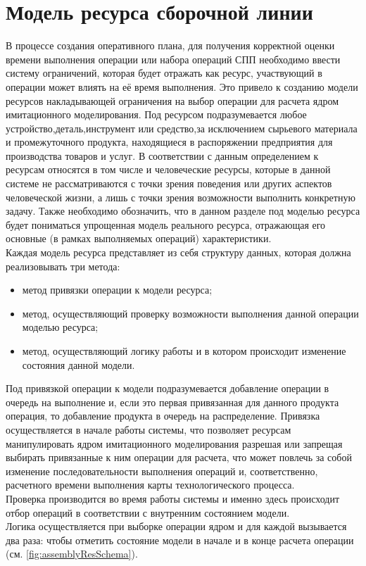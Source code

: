\section{Модель ресурса сборочной линии}
\indent В процессе создания оперативного плана, для получения корректной оценки времени выполнения операции или набора операций СПП необходимо ввести систему ограничений, которая будет отражать как ресурс, участвующий в операции может влиять на её время выполнения.
Это привело к созданию модели ресурсов накладывающей ограничения на выбор операции для расчета ядром имитационного моделирования.
Под ресурсом подразумевается любое устройство,деталь,инструмент или средство,за исключением сырьевого материала и промежуточного продукта, находящиеся в распоряжении предприятия для производства товаров и услуг.
В соответствии с данным определением к ресурсам относятся в том числе и человеческие ресурсы, которые в данной системе не рассматриваются с точки зрения поведения или других аспектов человеческой жизни, а лишь с точки зрения возможности выполнить конкретную задачу.
Также необходимо обозначить, что в данном разделе под моделью ресурса будет пониматься упрощенная модель реального ресурса, отражающая его основные (в рамках выполняемых операций) характеристики.\\
\indent Каждая модель ресурса представляет из себя структуру данных, которая должна реализовывать три метода:
\begin{itemize}
	\item метод привязки операции к модели ресурса;
	\item метод, осуществляющий проверку возможности выполнения данной операции моделью ресурса;
	\item метод, осуществляющий логику работы и в котором происходит изменение состояния данной модели.
\end{itemize}

\indent Под привязкой операции к модели подразумевается добавление операции в очередь на выполнение и, если это первая привязанная для данного продукта операция, то добавление продукта в очередь на распределение. Привязка осуществляется в начале работы системы, что позволяет ресурсам манипулировать ядром имитационного моделирования разрешая или запрещая выбирать привязанные к ним операции для расчета, что может повлечь за собой изменение последовательности выполнения операций и, соответственно, расчетного времени выполнения карты технологического процесса.\\
\indent Проверка производится во время работы системы и именно здесь происходит отбор операций в соответствии с внутренним состоянием модели.\\
\indent Логика осуществляется при выборке операции ядром и для каждой вызывается два раза: чтобы отметить состояние модели в начале и в конце расчета операции (см. \ref{fig:assemblyResSchema}).

